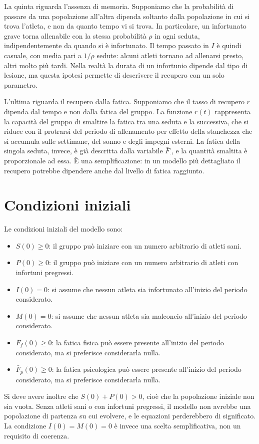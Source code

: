 La quinta riguarda l'assenza di memoria. Supponiamo che la probabilità di passare da una popolazione all'altra dipenda soltanto dalla popolazione in cui si trova l'atleta, e non da quanto tempo vi si trova. In particolare, un infortunato grave torna allenabile con la stessa probabilità $\rho$ in ogni seduta, indipendentemente da quando si è infortunato. Il tempo passato in $I$ è quindi casuale, con media pari a $1 / \rho$ sedute: alcuni atleti tornano ad allenarsi presto, altri molto più tardi. Nella realtà la durata di un infortunio dipende dal tipo di lesione, ma questa ipotesi permette di descrivere il recupero con un solo parametro. \par

L'ultima riguarda il recupero dalla fatica. Supponiamo che il tasso di recupero $r$ dipenda dal tempo e non dalla fatica del gruppo. La funzione $r(t)$ rappresenta la capacità del gruppo di smaltire la fatica tra una seduta e la successiva, che si riduce con il protrarsi del periodo di allenamento per effetto della stanchezza che si accumula sulle settimane, del sonno e degli impegni esterni. La fatica della singola seduta, invece, è già descritta dalla variabile $\bar{F}_\cdot$, e la quantità smaltita è proporzionale ad essa. È una semplificazione: in un modello più dettagliato il recupero potrebbe dipendere anche dal livello di fatica raggiunto.

\section{Condizioni iniziali}

Le condizioni iniziali del modello sono:
\begin{itemize}
    \item $S(0) \geq 0$: il gruppo può iniziare con un numero arbitrario di atleti sani.
    \item $P(0) \geq 0$: il gruppo può iniziare con un numero arbitrario di atleti con infortuni pregressi.
    \item $I(0) = 0$: si assume che nessun atleta sia infortunato all'inizio del periodo considerato.
    \item $M(0) = 0$: si assume che nessun atleta sia malconcio all'inizio del periodo considerato.
    \item $\bar{F}_f(0) \geq 0$: la fatica fisica può essere presente all'inizio del periodo considerato, ma si preferisce considerarla nulla.
    \item $\bar{F}_p(0) \geq 0$: la fatica psicologica può essere presente all'inizio del periodo considerato, ma si preferisce considerarla nulla.
\end{itemize}
Si deve avere inoltre che $S(0) + P(0) > 0$, cioè che la popolazione iniziale non sia vuota. Senza atleti sani o con infortuni pregressi, il modello non avrebbe una popolazione di partenza su cui evolvere, e le equazioni perderebbero di significato. La condizione $I(0) = M(0) = 0$ è invece una scelta semplificativa, non un requisito di coerenza. \par

